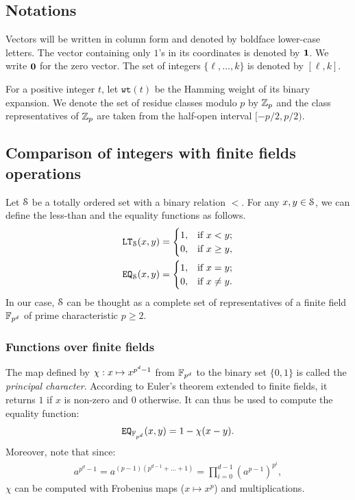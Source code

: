 \subsection{Notations}
  Vectors will be written in column form and denoted by boldface lower-case letters. The vector containing only $1$'s in its coordinates is denoted by $\1$. We write $\0$ for the zero vector. The set of integers $\{\ell,\dots,k\}$ is denoted by $[\ell,k]$.

  For a positive integer $t$, let $\texttt{wt}(t)$ be the Hamming weight of its binary expansion. We denote the set of residue classes modulo $p$ by $\Z_p$ and the class representatives of $\Z_p$ are taken from the half-open interval $[-p/2, p/2)$.

\subsection{Comparison of integers with finite fields operations}
Let $\S$ be a totally ordered set with a binary relation $<$.
For any $x,y \in \S$, we can define the less-than and the equality functions as follows.
\begin{align*}
  \LT_\S(x,y) = 
  \begin{cases}
    1, & \text{if } x < y; \\
    0, & \text{if } x \ge y, \\
  \end{cases}
  \\
  \EQ_\S(x,y) = 
  \begin{cases}
    1, & \text{if } x = y; \\
    0, & \text{if } x \neq y. \\
  \end{cases}
\end{align*}
In our case, $\S$ can be thought as a complete set of representatives of a finite field $\F_{p^d}$ of prime characteristic $p\geq 2$.

\subsubsection{Functions over finite fields}\label{subsec:funcff}
The map defined by $\princhar: x \mapsto x^{p^d-1}$ from $\F_{p^d}$ to the binary set $\{0,1\}$ is called the \emph{principal character}. According to Euler's theorem extended to finite fields, it returns $1$ if $x$ is non-zero and $0$ otherwise. It can thus be used to compute the equality function:
\begin{align*}
  \EQ_{\F_{p^d}}(x,y) = 1 - \princhar (x-y).
\end{align*}
Moreover, note that since:
\begin{align}\label{eq:exp_frob}
  a^{p^d-1} = a^{(p-1)(p^{d-1} + \dots + 1)} = \prod_{i=0}^{d-1} \left(a^{p-1}\right)^{p^i},
\end{align}
$\chi$ can be computed with Frobenius maps ($x \mapsto x^p$) and multiplications.

